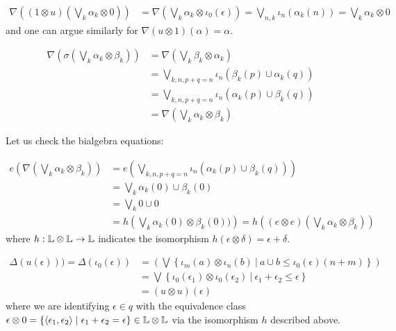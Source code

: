 \begin{itemize}
{\small
\begin{align*}
\nabla\left(
(1\otimes u)\left(\bigvee_{k}\alpha_{k}\otimes 0\right)\right) & =
\nabla\left( \bigvee_{k}\alpha_{k}\otimes\iota_{0}(\epsilon)\right)
=
\bigvee_{n,k}\iota_{n}( \alpha_{k}(n) )
 =  \bigvee_{k}\alpha_{k} \otimes 0
\end{align*}
}
and one can argue similarly for $\nabla(u\otimes 1)(\alpha)=\alpha$.

{\small
\begin{align*}
\nabla\left (\sigma\left (\bigvee_{k}\alpha_{k}\otimes \beta_{k}
\right) \right) & = 
\nabla \left (
\bigvee_{k}\beta_{k}\otimes \alpha_{k}
\right)\\
&= 
\bigvee_{k,n, p+q=n} \iota_{n}(\beta_{k}(p)\cup \alpha_{k}(q))
\\
&= 
\bigvee_{k,n, p+q=n}\iota_{n}( \alpha_{k}(p)\cup \beta_{k}(q))
\\
&= \nabla\left (\bigvee_{k}\alpha_{k}\otimes \beta_{k}\right)
\end{align*}
}

Let us check the bialgebra equations:

{\small
\begin{align*}
e\left (\nabla\left (\bigvee_{k}\alpha_{k}\otimes \beta_{k}\right)\right)  & =
e\left(
\bigvee_{k,n, p+q=n}\iota_{n}(\alpha_{k}(p)\cup \beta_{k}(q))
\right)
\\
&= \bigvee_{k}\alpha_{k}(0)\cup\beta_{k}(0) \\
&= \bigvee_{k} 0\cup 0\\
&= h\left(\bigvee_{k}\alpha_{k}(0)\otimes\beta_{k}(0))\right) = h\left( (e\otimes e)\left(\bigvee_{k}\alpha_{k}\otimes \beta_{k}\right)\right)
\end{align*}
}
where $h:\mathbb{L}\otimes\mathbb{L}\to \mathbb{L}$ indicates the isomorphism $h(\epsilon\otimes \delta)=\epsilon+\delta$.

{\small
\begin{align*}
\Delta(u(\epsilon))) = \Delta(\iota_{0}(\epsilon)) &=
 \left(
\bigvee\left\{\iota_{m}(a)\otimes\iota_{n}(b) \ \Bigg \vert \ 
a\cup b \leq \iota_{0}(\epsilon)(n+m)\right\}\right)\\
&=\bigvee\left\{\iota_{0}(\epsilon_{1})\otimes\iota_{0}(\epsilon_{2}) \ \Bigg \vert \ 
\epsilon_{1}+\epsilon_{2} \leq \epsilon\right\}\\
&= (u\otimes u)(\epsilon)
\end{align*}
}
where we are identifying $\epsilon \in q$ with the equivalence class
$\epsilon \otimes 0 = \{ \langle \epsilon_{1},\epsilon_{2}\rangle\mid \epsilon_{1}+\epsilon_{2}=\epsilon\}\in 
\mathbb{L}\otimes\mathbb{L}$ via the isomorphism $h$ described above.


\end{itemize}
